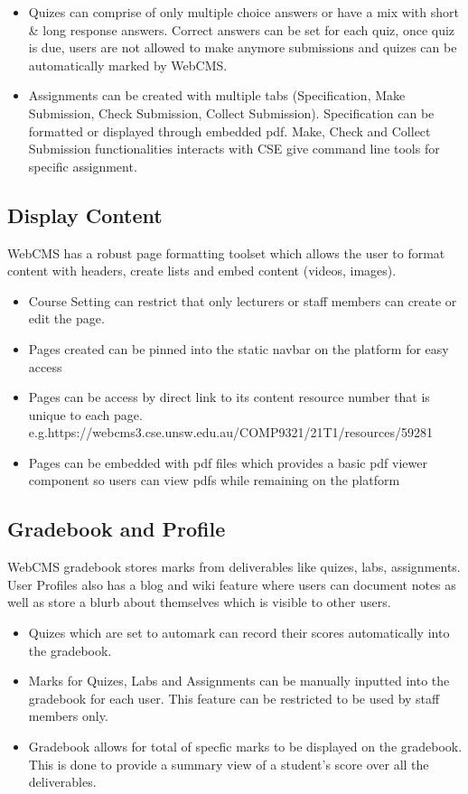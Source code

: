 \begin{itemize}
	\item Quizes can comprise of only multiple choice answers or have a mix with short \& long response answers. Correct answers can be set for each quiz, once quiz is due, users are not allowed to make anymore submissions and quizes can be automatically marked by WebCMS.
	\item Assignments can be created with multiple tabs (Specification, Make Submission, Check Submission, Collect Submission). Specification can be formatted or displayed through embedded pdf. Make, Check and Collect Submission functionalities interacts with CSE give command line tools for specific assignment.
\end{itemize}

\subsection{Display Content}
WebCMS has a robust page formatting toolset which allows the user to format content with headers, create lists and embed content (videos, images).

\begin{itemize}
	\item Course Setting can restrict that only lecturers or staff members can create or edit the page.
	\item Pages created can be pinned into the static navbar on the platform for easy access
	\item Pages can be access by direct link to its content resource number that is unique to each page. e.g.https://webcms3.cse.unsw.edu.au/COMP9321/21T1/resources/59281
	\item Pages can be embedded with pdf files which provides a basic pdf viewer component so users can view pdfs while remaining on the platform
\end{itemize}

\subsection{Gradebook and Profile}
WebCMS gradebook stores marks from deliverables like quizes, labs, assignments. User Profiles also has a blog and wiki feature where users can document notes as well as store a blurb about themselves which is visible to other users.

\begin{itemize}
	\item Quizes which are set to automark can record their scores automatically into the gradebook.
	\item Marks for Quizes, Labs and Assignments can be manually inputted into the gradebook for each user. This feature can be restricted to be used by staff members only.
	\item Gradebook allows for total of specfic marks to be displayed on the gradebook. This is done to provide a summary view of a student's score over all the deliverables.
\end{itemize}

